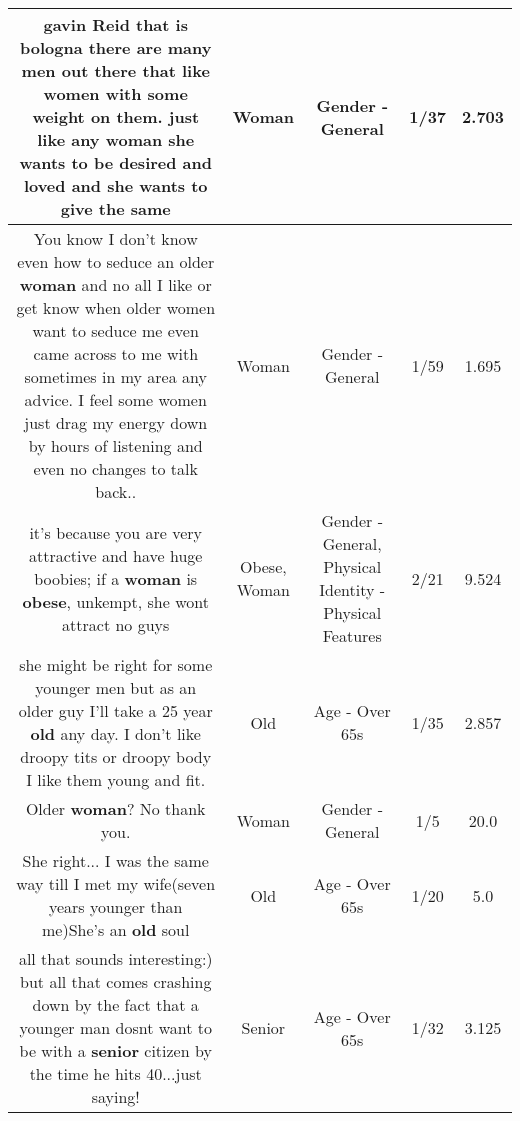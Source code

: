 \documentclass[11pt]{article}
\newlength\mylength
\begin{document}
\begin{center}
\begin{longtable}{|C{.65\mylength}|C{.30\mylength}|C{.12\mylength}|C{.12\mylength}|C{.12\mylength}|}
  \small gavin Reid  that is bologna there are many men out there that like women with some weight on them. just like any \textbf{woman} she wants to be desired and loved and she wants to give the same\normalsize   & Woman & Gender - General & 1/37 & 2.703 \\  \hline
  \small You know I don't know even how to seduce an older \textbf{woman} and no all I like or get know when older women want to seduce me even came across to me with sometimes in my area any advice.  I feel some women just drag my energy down by hours of listening and even no changes to talk back..\normalsize   & Woman & Gender - General & 1/59 & 1.695 \\  \hline
  \small it's because you are very attractive and have huge boobies; if a \textbf{woman} is \textbf{obese}, unkempt, she wont attract no guys\normalsize   & Obese, Woman & Gender - General, Physical Identity - Physical Features & 2/21 & 9.524 \\  \hline
  \small she might be right for some younger men but as an older guy I'll take a 25 year \textbf{old} any day. I don't like droopy tits or droopy body I like them young and fit.\normalsize   & Old & Age - Over 65s & 1/35 & 2.857 \\  \hline
  \small Older \textbf{woman}? No thank you.\normalsize   & Woman & Gender - General & 1/5 & 20.0 \\  \hline
  \small She right... I was the same way till I met my wife(seven years younger than me)She's an \textbf{old} soul\normalsize   & Old & Age - Over 65s & 1/20 & 5.0 \\  \hline
  \small all that sounds interesting:) but all that comes crashing down by the fact that a younger man dosnt want to be with a \textbf{senior} citizen by the time he hits 40...just saying!\normalsize   & Senior & Age - Over 65s & 1/32 & 3.125 \\  \hline

\end{longtable}
\end{center}
\end{document}
